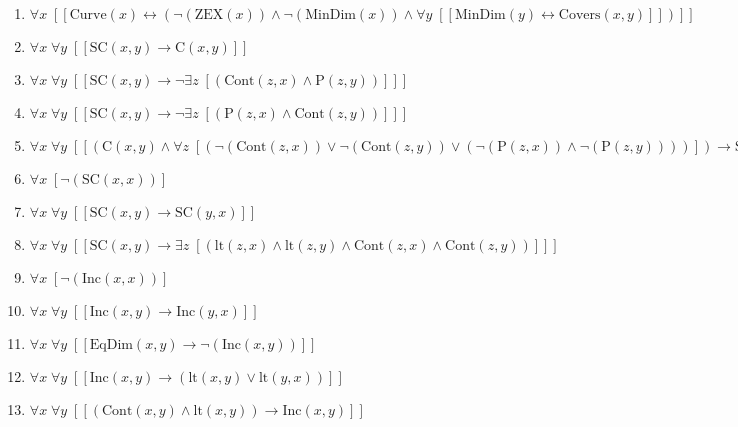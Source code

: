\documentclass{article}
\begin{document}
\begin{enumerate}
\item $\forall x\;  \left[ \left[ \textrm{Curve}(x) \leftrightarrow \left(\neg \left(\textrm{ZEX}(x)\right) \land \neg \left(\textrm{MinDim}(x)\right) \land \forall y\;  \left[ \left[ \textrm{MinDim}(y) \leftrightarrow \textrm{Covers}(x,y) \right] \right]\right) \right] \right]$
\item $\forall x\; \forall y\;  \left[ \left[ \textrm{SC}(x,y) \rightarrow \textrm{C}(x,y) \right] \right]$
\item $\forall x\; \forall y\;  \left[ \left[ \textrm{SC}(x,y) \rightarrow \neg \exists z\;  \left[ \left(\textrm{Cont}(z,x) \land \textrm{P}(z,y)\right) \right] \right] \right]$
\item $\forall x\; \forall y\;  \left[ \left[ \textrm{SC}(x,y) \rightarrow \neg \exists z\;  \left[ \left(\textrm{P}(z,x) \land \textrm{Cont}(z,y)\right) \right] \right] \right]$
\item $\forall x\; \forall y\;  \left[ \left[ \left(\textrm{C}(x,y) \land \forall z\;  \left[ \left(\neg \left(\textrm{Cont}(z,x)\right) \lor \neg \left(\textrm{Cont}(z,y)\right) \lor \left(\neg \left(\textrm{P}(z,x)\right) \land \neg \left(\textrm{P}(z,y)\right)\right)\right) \right]\right) \rightarrow \textrm{SC}(x,y) \right] \right]$
\item $\forall x\;  \left[ \neg \left(\textrm{SC}(x,x)\right) \right]$
\item $\forall x\; \forall y\;  \left[ \left[ \textrm{SC}(x,y) \rightarrow \textrm{SC}(y,x) \right] \right]$
\item $\forall x\; \forall y\;  \left[ \left[ \textrm{SC}(x,y) \rightarrow \exists z\;  \left[ \left(\textrm{lt}(z,x) \land \textrm{lt}(z,y) \land \textrm{Cont}(z,x) \land \textrm{Cont}(z,y)\right) \right] \right] \right]$
\item $\forall x\;  \left[ \neg \left(\textrm{Inc}(x,x)\right) \right]$
\item $\forall x\; \forall y\;  \left[ \left[ \textrm{Inc}(x,y) \rightarrow \textrm{Inc}(y,x) \right] \right]$
\item $\forall x\; \forall y\;  \left[ \left[ \textrm{EqDim}(x,y) \rightarrow \neg \left(\textrm{Inc}(x,y)\right) \right] \right]$
\item $\forall x\; \forall y\;  \left[ \left[ \textrm{Inc}(x,y) \rightarrow \left(\textrm{lt}(x,y) \lor \textrm{lt}(y,x)\right) \right] \right]$
\item $\forall x\; \forall y\;  \left[ \left[ \left(\textrm{Cont}(x,y) \land \textrm{lt}(x,y)\right) \rightarrow \textrm{Inc}(x,y) \right] \right]$

\end{enumerate}
\end{document}
